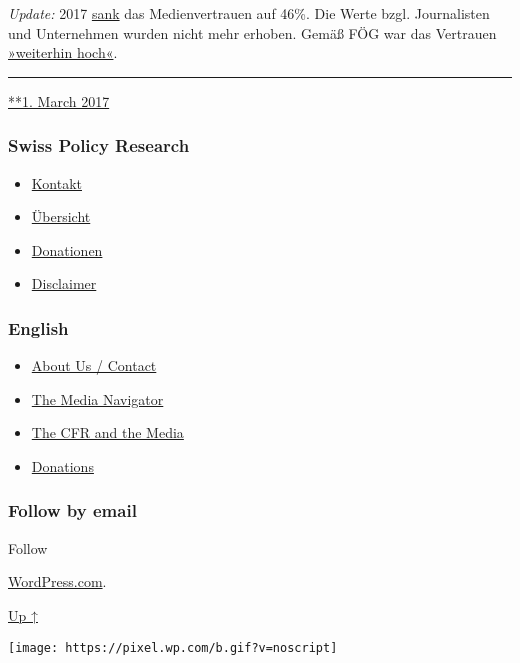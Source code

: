 \emph{Update:} 2017
\href{http://www.digitalnewsreport.org/survey/2017/switzerland-2017/}{sank}
das Medienvertrauen auf 46\%. Die Werte bzgl. Journalisten und
Unter­neh­men wurden nicht mehr erhoben. Gemäß FÖG war das Vertrauen
\href{http://www.foeg.uzh.ch/dam/jcr:0d0e5a10-27be-4e97-b264-b2cf7de96bbd/Broschur_Jahrbuch_foeg_deutsch_2017_ohne_Sperrvermerk.pdf}{»weiterhin
hoch«}.

\begin{center}\rule{0.5\linewidth}{\linethickness}\end{center}

\href{https://swprs.org/2017/03/01/schweizer-medien-vertrauen/}{**1.
March 2017}

\hypertarget{swiss-policy-research}{%
\subsubsection{Swiss Policy Research}\label{swiss-policy-research}}

\begin{itemize}
\tightlist
\item
  \href{https://swprs.org/kontakt/}{Kontakt}
\item
  \href{https://swprs.org/uebersicht/}{Übersicht}
\item
  \href{https://swprs.org/donationen/}{Donationen}
\item
  \href{https://swprs.org/disclaimer/}{Disclaimer}
\end{itemize}

\hypertarget{english}{%
\subsubsection{English}\label{english}}

\begin{itemize}
\tightlist
\item
  \href{https://swprs.org/contact/}{About Us / Contact}
\item
  \href{https://swprs.org/media-navigator/}{The Media Navigator}
\item
  \href{https://swprs.org/the-american-empire-and-its-media/}{The CFR
  and the Media}
\item
  \href{https://swprs.org/donations/}{Donations}
\end{itemize}

\hypertarget{follow-by-email}{%
\subsubsection{Follow by email}\label{follow-by-email}}

Follow

\href{https://wordpress.com/?ref=footer_custom_com}{WordPress.com}.

\protect\hyperlink{}{Up ↑}

\texttt{[image: https://pixel.wp.com/b.gif?v=noscript]}
